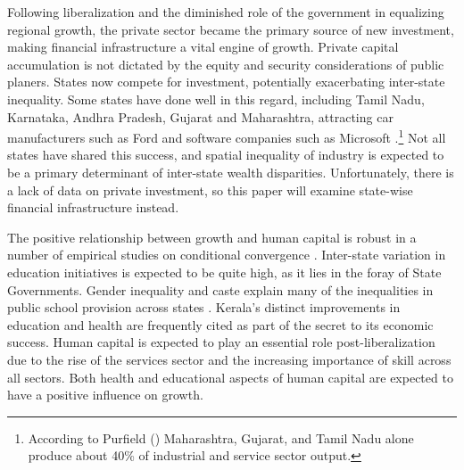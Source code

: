 \documentclass[a4paper, 11pt]{article}
\begin{document}
Following liberalization and the diminished role of the government in equalizing regional growth, the private sector became the primary source of new investment, making financial infrastructure a vital engine of growth.  Private capital accumulation is not dictated by the equity and security considerations of public planers.  States now compete for investment, potentially exacerbating inter-state inequality.  Some states have done well in this regard, including Tamil Nadu, Karnataka, Andhra Pradesh, Gujarat and Maharashtra, attracting car manufacturers such as Ford and software companies such as Microsoft \citep{bajpai_trends_1996}.\footnote{According to Purfield (\citeyear{purfield_mind_2006}) Maharashtra, Gujarat, and Tamil Nadu alone produce about 40\% of industrial and service sector output.}  Not all states have shared this success, and spatial inequality of industry is expected to be a primary determinant of inter-state wealth disparities.  Unfortunately, there is a lack of data on private investment, so this paper will examine state-wise financial infrastructure instead.\par
The positive relationship between growth and human capital is robust in a number of empirical studies on conditional convergence \citep{mankiw_contribution_1992}.  Inter-state variation in education initiatives is expected to be quite high, as it lies in the foray of State Governments.  Gender inequality and caste explain many of the inequalities in public school provision across states \citep{baddeley_divergence_2006}.  Kerala’s distinct improvements in education and health are frequently cited as part of the secret to its economic success.  Human capital is expected to play an essential role post-liberalization due to the rise of the services sector and the increasing importance of skill across all sectors.  Both health and educational aspects of human capital are expected to have a positive influence on growth.  \par
\end{document}
